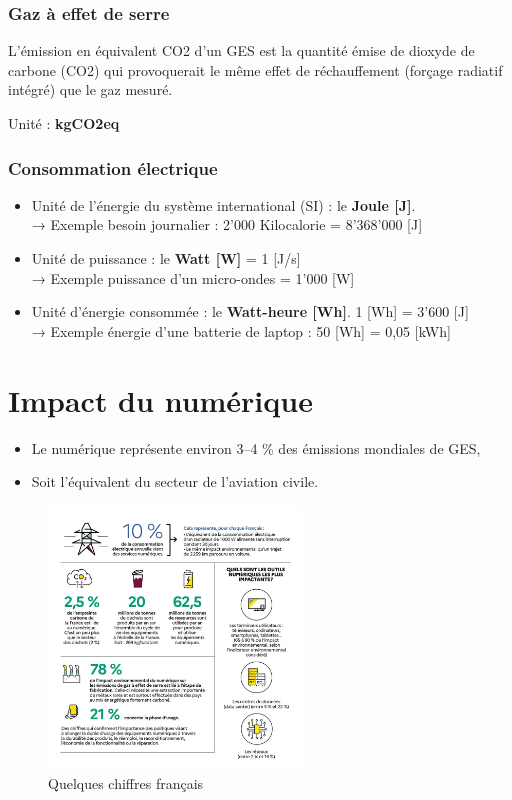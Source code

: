 \documentclass[11pt, a4paper]{book}
\begin{document}
\subsubsection{Gaz à effet de serre}
L'émission en équivalent CO2 d’un GES est la quantité émise de dioxyde de carbone (CO2) qui provoquerait le même effet de réchauffement (forçage radiatif intégré) que le gaz mesuré.


Unité : \textbf{kgCO2eq}

\subsubsection{Consommation électrique}
\begin{itemize}
    \item Unité de l’énergie du système international (SI) : le \textbf{Joule [J]}.\\
    → Exemple besoin journalier : 2’000 Kilocalorie = 8’368’000 [J]
    \item Unité de puissance : le \textbf{Watt [W]} = 1 [J/s]\\
    → Exemple puissance d’un micro-ondes = 1’000 [W]
    \item Unité d’énergie consommée : le \textbf{Watt-heure [Wh]}. 1 [Wh] = 3’600 [J] \\
    → Exemple énergie d’une batterie de laptop : 50 [Wh] = 0,05 [kWh]
\end{itemize}




\section{Impact du numérique}
\begin{itemize}
  \item Le numérique représente environ 3--4 \% des émissions mondiales de GES,
  \item Soit l’équivalent du secteur de l’aviation civile.
\end{itemize}

\begin{figure}[h!]
  \centering
  \includegraphics[width=0.6\textwidth]{images/impact-eco/image6.png}
  \caption{Quelques chiffres français}
  \label{fig:unites}
\end{figure}
\end{document}
